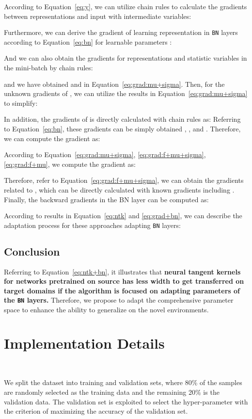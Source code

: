 \documentclass{article} \usepackage{iclr2024_conference,times}
\begin{document}
According to Equation~\ref{eq:y}, we can utilize chain rules to calculate the gradients between representations and input with intermediate variables:

Furthermore, we can derive the gradient of learning representation  in \texttt{BN} layers according to Equation~\ref{eq:bn} for learnable parameters :
 
And we can also obtain the gradients for representations and statistic variables in the mini-batch by chain rules:
 
and we have obtained  and  in Equation~\ref{eq:grad:mu+sigma}. Then, for the unknown gradients of , we can utilize the results in Equation~\ref{eq:grad:mu+sigma} to simplify:
 
In addition, the gradients of  is directly calculated with chain rules as: Referring to Equation~\ref{eq:bn}, these gradients can be simply obtained , , and . Therefore, we can compute the gradient  as:

According to Equation~\ref{eq:grad:mu+sigma}, \ref{eq:grad:f+mu+sigma}, \ref{eq:grad:f+mu}, we compute the gradient as:

Therefore, refer to Equation~\ref{eq:grad:f+mu+sigma}, we can obtain the gradients  related to , which can be directly calculated with known gradients including . Finally, the backward gradients in the BN layer can be computed as:

According to results in Equation~\ref{eq:ntk} and \ref{eq:grad+bn}, we can describe the adaptation process for these approaches adapting \texttt{BN} layers:

\subsection{Conclusion}
Referring to Equation~\ref{eq:ntk+bn}, it illustrates that \textbf{neural tangent kernels for networks pretrained on source has less width to get transferred on target domains if the algorithm is focused on adapting parameters of the \texttt{BN} layers.} Therefore, we propose to adapt the comprehensive parameter space to enhance the ability to generalize on the novel environments.

\section{Implementation Details}~\label{sec:imple}

We split the dataset into training and validation sets, where 80\% of the samples are randomly selected as the training data and the remaining 20\% is the validation data. The validation set is exploited to select the hyper-parameter with the criterion of maximizing the accuracy of the validation set. 
\end{document}
